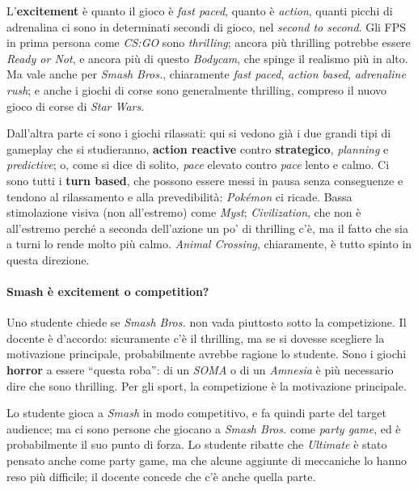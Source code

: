 L'\textbf{excitement} è quanto il gioco è \emph{fast paced}, quanto è
\emph{action}, quanti picchi di adrenalina ci sono in determinati secondi di
gioco, nel \emph{second to second}. Gli FPS in prima persona come \emph{CS:GO}
sono \emph{thrilling}; ancora più thrilling potrebbe essere \emph{Ready or
Not}, e ancora più di questo \emph{Bodycam}, che spinge il realismo più in
alto. Ma vale anche per \emph{Smash Bros.}, chiaramente \emph{fast paced},
\emph{action based}, \emph{adrenaline rush}; e anche i giochi di corse sono
generalmente thrilling, compreso il nuovo gioco di corse di \emph{Star Wars}.

Dall'altra parte ci sono i giochi rilassati: qui si vedono già i due grandi
tipi di gameplay che si studieranno, \textbf{action reactive} contro
\textbf{strategico}, \emph{planning} e \emph{predictive}; o, come si dice di
solito, \emph{pace} elevato contro \emph{pace} lento e calmo. Ci sono tutti i
\textbf{turn based}, che possono essere messi in pausa senza conseguenze e
tendono al rilassamento e alla prevedibilità: \emph{Pokémon} ci ricade.
Bassa stimolazione visiva (non all'estremo) come \emph{Myst};
\emph{Civilization}, che non è all'estremo perché a seconda dell'azione un po'
di thrilling c'è, ma il fatto che sia a turni lo rende molto più calmo.
\emph{Animal Crossing}, chiaramente, è tutto spinto in questa direzione.

\paragraph{Smash è excitement o competition?} Uno studente chiede se
\emph{Smash Bros.} non vada piuttosto sotto la competizione. Il docente è
d'accordo: sicuramente c'è il thrilling, ma se si dovesse scegliere la
motivazione principale, probabilmente avrebbe ragione lo studente. Sono i
giochi \textbf{horror} a essere ``questa roba'': di un \emph{SOMA} o di un
\emph{Amnesia} è più necessario dire che sono thrilling. Per gli sport, la
competizione è la motivazione principale.

Lo studente gioca a \emph{Smash} in modo competitivo, e fa quindi parte del
target audience; ma ci sono persone che giocano a \emph{Smash Bros.} come
\emph{party game}, ed è probabilmente il suo punto di forza. Lo studente
ribatte che \emph{Ultimate} è stato pensato anche come party game, ma che
alcune aggiunte di meccaniche lo hanno reso più difficile; il docente
concede che c'è anche quella parte.


